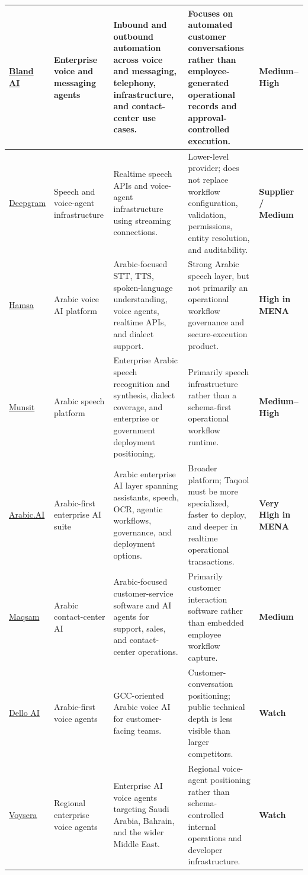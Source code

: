 \documentclass[10.5pt,a4paper]{article}
\newcommand{\BrandName}{Taqool}
\begin{document}
\begin{longtable}{L{25mm}L{27mm}L{48mm}L{51mm}L{16mm}}
\href{https://www.bland.ai/}{Bland AI}
& Enterprise voice and messaging agents
& Inbound and outbound automation across voice and messaging, telephony, infrastructure, and contact-center use cases.
& Focuses on automated customer conversations rather than employee-generated operational records and approval-controlled execution.
& \textbf{Medium--High} \\
\midrule

\href{https://developers.deepgram.com/docs/build-a-voice-agent}{Deepgram}
& Speech and voice-agent infrastructure
& Realtime speech APIs and voice-agent infrastructure using streaming connections.
& Lower-level provider; does not replace workflow configuration, validation, permissions, entity resolution, and auditability.
& \textbf{Supplier / Medium} \\
\midrule

\href{https://tryhamsa.com/}{Hamsa}
& Arabic voice AI platform
& Arabic-focused STT, TTS, spoken-language understanding, voice agents, realtime APIs, and dialect support.
& Strong Arabic speech layer, but not primarily an operational workflow governance and secure-execution product.
& \textbf{High in MENA} \\
\midrule

\href{https://munsit.com/enterprise}{Munsit}
& Arabic speech platform
& Enterprise Arabic speech recognition and synthesis, dialect coverage, and enterprise or government deployment positioning.
& Primarily speech infrastructure rather than a schema-first operational workflow runtime.
& \textbf{Medium--High} \\
\midrule

\href{https://arabic.ai/}{Arabic.AI}
& Arabic-first enterprise AI suite
& Arabic enterprise AI layer spanning assistants, speech, OCR, agentic workflows, governance, and deployment options.
& Broader platform; \BrandName{} must be more specialized, faster to deploy, and deeper in realtime operational transactions.
& \textbf{Very High in MENA} \\
\midrule

\href{https://maqsam.com/}{Maqsam}
& Arabic contact-center AI
& Arabic-focused customer-service software and AI agents for support, sales, and contact-center operations.
& Primarily customer interaction software rather than embedded employee workflow capture.
& \textbf{Medium} \\
\midrule

\href{https://dello.ai/}{Dello AI}
& Arabic-first voice agents
& GCC-oriented Arabic voice AI for customer-facing teams.
& Customer-conversation positioning; public technical depth is less visible than larger competitors.
& \textbf{Watch} \\
\midrule

\href{https://voysera.ai/}{Voysera}
& Regional enterprise voice agents
& Enterprise AI voice agents targeting Saudi Arabia, Bahrain, and the wider Middle East.
& Regional voice-agent positioning rather than schema-controlled internal operations and developer infrastructure.
& \textbf{Watch} \\

\bottomrule
\end{longtable}
\normalsize
\end{document}
